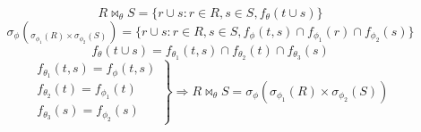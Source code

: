 \documentclass{report}
\begin{document}
\begin{equation}
R \bowtie_\theta S=\{r \cup s:r \in R,s \in S,f_\theta(t \cup s)\}
\end{equation}
\begin{equation}
\sigma_\phi(_{\sigma_{\phi_1}(R) \times \sigma_{\phi_2}(S)})=\{r \cup s:r \in R,s \in S,f_\phi(t,s) \cap f_{\phi_1}(r) \cap f_{\phi_2}(s)\}
\end{equation}
\begin{equation}
f_\theta(t \cup s)=f_{\theta_1}(t,s) \cap f_{\theta_2}(t) \cap f_{\theta_3}(s)
\end{equation}
\begin{equation}
\left.
\begin{array}{lll}
f_{\theta_1}(t,s)=f_\phi(t,s)\\
f_{\theta_2}(t)=f_{\phi_1}(t)\\
f_{\theta_3}(s)=f_{\phi_2}(s)
\end{array} 
\right\}
\Rightarrow
R \bowtie_\theta S=\sigma_\phi(\sigma_{\phi_1}(R) \times \sigma_{\phi_2}(S))
\end{equation}
\end{document}
